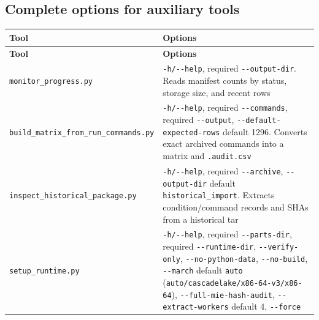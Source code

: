 \subsection{Complete options for auxiliary tools}
\label{sec:auto:06_python_batch:10.3}

{\TableFont
\begin{longtable}{@{}>{\raggedright\arraybackslash}p{}>{\raggedright\arraybackslash}p{}@{}}
\toprule
\textbf{Tool} & \textbf{Options} \\
\midrule
\endfirsthead
\toprule
\textbf{Tool} & \textbf{Options} \\
\midrule
\endhead
\bottomrule
\endfoot
\texttt{monitor\_\allowbreak{}progress.\allowbreak{}py} & \texttt{-\allowbreak{}h/\allowbreak{}-\allowbreak{}-\allowbreak{}help}, required \texttt{-\allowbreak{}-\allowbreak{}output-\allowbreak{}dir}. Reads manifest counts by status, storage size, and recent rows \\
\texttt{build\_\allowbreak{}matrix\_\allowbreak{}from\_\allowbreak{}run\_\allowbreak{}commands.\allowbreak{}py} & \texttt{-\allowbreak{}h/\allowbreak{}-\allowbreak{}-\allowbreak{}help}, required \texttt{-\allowbreak{}-\allowbreak{}commands}, required \texttt{-\allowbreak{}-\allowbreak{}output}, \texttt{-\allowbreak{}-\allowbreak{}default-\allowbreak{}expected-\allowbreak{}rows} default 1296. Converts exact archived commands into a matrix and \texttt{.\allowbreak{}audit.\allowbreak{}csv} \\
\texttt{inspect\_\allowbreak{}historical\_\allowbreak{}package.\allowbreak{}py} & \texttt{-\allowbreak{}h/\allowbreak{}-\allowbreak{}-\allowbreak{}help}, required \texttt{-\allowbreak{}-\allowbreak{}archive}, \texttt{-\allowbreak{}-\allowbreak{}output-\allowbreak{}dir} default \texttt{historical\_\allowbreak{}import}. Extracts condition/command records and SHAs from a historical tar \\
\texttt{setup\_\allowbreak{}runtime.\allowbreak{}py} & \texttt{-\allowbreak{}h/\allowbreak{}-\allowbreak{}-\allowbreak{}help}, required \texttt{-\allowbreak{}-\allowbreak{}parts-\allowbreak{}dir}, required \texttt{-\allowbreak{}-\allowbreak{}runtime-\allowbreak{}dir}, \texttt{-\allowbreak{}-\allowbreak{}verify-\allowbreak{}only}, \texttt{-\allowbreak{}-\allowbreak{}no-\allowbreak{}python-\allowbreak{}data}, \texttt{-\allowbreak{}-\allowbreak{}no-\allowbreak{}build}, \texttt{-\allowbreak{}-\allowbreak{}march} default \texttt{auto} (\texttt{auto/\allowbreak{}cascadelake/\allowbreak{}x86-\allowbreak{}64-\allowbreak{}v3/\allowbreak{}x86-\allowbreak{}64}), \texttt{-\allowbreak{}-\allowbreak{}full-\allowbreak{}mie-\allowbreak{}hash-\allowbreak{}audit}, \texttt{-\allowbreak{}-\allowbreak{}extract-\allowbreak{}workers} default 4, \texttt{-\allowbreak{}-\allowbreak{}force} \\
\end{longtable}
}

